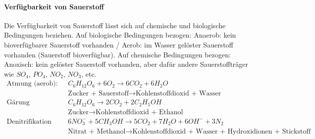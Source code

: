 \documentclass[9pt, openright=false]{scrartcl}
\begin{document}
\paragraph{Verfügbarkeit von Sauerstoff} Die Verfügbarkeit von Sauerstoff lässt sich auf chemische und biologische Bedingungen beziehen. Auf biologische Bedingungen bezogen: Anaerob: kein bioverfügbarer Sauerstoff vorhanden / Aerob: im Wasser gelöster Sauerstoff vorhanden (Sauerstoff bioverfügbar). Auf chemische Bedingungen bezogen: Anoxisch: kein gelöster Sauerstoff vorhanden, aber dafür andere Sauerstoffträger wie $SO_4$, $PO_4$, $NO_2$, $NO_3$, etc.\[\begin{split} \textrm{Atmung (aerob):} & C_6H_{12}O_6 + 6O_2 \rightarrow 6 CO_2 + 6 H_2O\\ &\textrm{Zucker + Sauerstoff} \rightarrow \textrm{Kohlenstoffdioxid + Wasser}\\ \textrm{Gärung (anaerob):}   & C_6H_{12}O_6 \rightarrow 2CO_2 + 2 C_2H_5OH\\ &\textrm{Zucker} \rightarrow \textrm{Kohlenstoffdioxid + Ethanol}\\ \textrm{Denitrifikation (anoxisch):} & 6NO_3^- + 5CH_3OH \rightarrow 5CO_2 + 7H_2O + 6OH^- + 3N_2\\ 
& \textrm{Nitrat + Methanol} \rightarrow \textrm{Kohlenstoffdioxid + Wasser + Hydroxidionen + Stickstoff}
\end{split}\]
\end{document}
